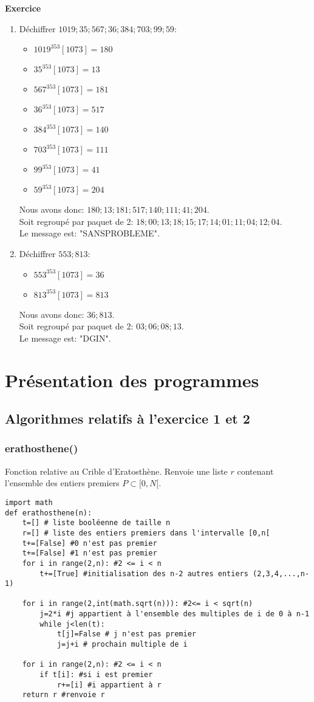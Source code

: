 \documentclass[10pt,a4paper,french]{article}
\newcounter{exercice}[section]
\newenvironment{exercice}[1][]{\refstepcounter{exercice}\par\medskip
   \noindent \textbf{Exercice~\theexercice #1} \rmfamily}{\medskip}
\begin{document}
\begin{exercice}
\begin{enumerate}
\item Déchiffrer $1019;35;567;36;384;703;99;59$:
\begin{itemize}
\item $1019^{353}[1073]=180$
\item $35^{353}[1073]=13$
\item $567^{353}[1073]=181$
\item $36^{353}[1073]=517$
\item $384^{353}[1073]=140$
\item $703^{353}[1073]=111$
\item $99^{353}[1073]=41$
\item $59^{353}[1073]=204$
\end{itemize}
Nous avons donc: $180;13;181;517;140;111;41;204$.\\
Soit regroupé par paquet de 2: $18;00;13;18;15;17;14;01;11;04;12;04$.\\
Le message est: "SANSPROBLEME".

\item Déchiffrer $553;813$:
\begin{itemize}
\item $553^{353}[1073]=36$
\item $813^{353}[1073]=813$

\end{itemize}
Nous avons donc: $36;813$.\\
Soit regroupé par paquet de 2: $03;06;08;13$.\\
Le message est: "DGIN".
\end{enumerate}
\end{exercice}
\section{Présentation des programmes}
\subsection{Algorithmes relatifs à l'exercice 1 et 2}
\subsubsection{erathosthene()}
Fonction relative au Crible d'Eratosthène. Renvoie une liste $r$ contenant l'ensemble des entiers premiers $P \subset [0,N[$.
\begin{lstlisting}
import math
def erathosthene(n):
    t=[] # liste booléenne de taille n
    r=[] # liste des entiers premiers dans l'intervalle [0,n[
    t+=[False] #0 n'est pas premier
    t+=[False] #1 n'est pas premier
    for i in range(2,n): #2 <= i < n
        t+=[True] #initialisation des n-2 autres entiers (2,3,4,...,n-1)
    
    for i in range(2,int(math.sqrt(n))): #2<= i < sqrt(n)
        j=2*i #j appartient à l'ensemble des multiples de i de 0 à n-1
        while j<len(t):
            t[j]=False # j n'est pas premier
            j=j+i # prochain multiple de i

    for i in range(2,n): #2 <= i < n
        if t[i]: #si i est premier
            r+=[i] #i appartient à r
    return r #renvoie r
\end{lstlisting}
\newpage
\end{document}
